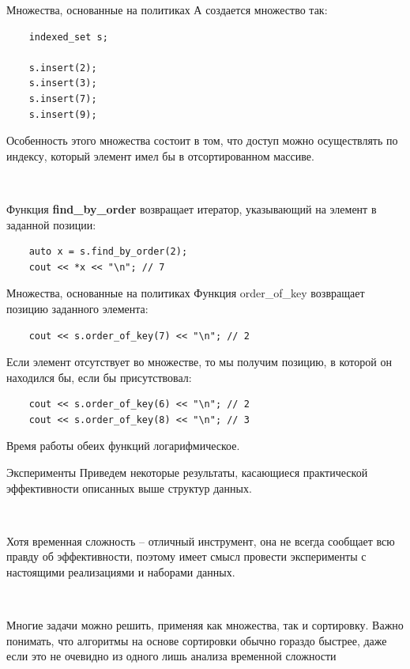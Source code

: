 \documentclass{beamer}
\begin{document}
\begin{frame}[fragile]{Множества, основанные на политиках}
    А создается множество так:
    
    \begin{verbatim}
    indexed_set s;
    
    s.insert(2);
    s.insert(3);
    s.insert(7);
    s.insert(9);
    \end{verbatim}
    
    
    Особенность этого множества состоит в том, что доступ можно осуществлять по индексу, который элемент имел бы в отсортированном массиве.
    
    ~
    
    Функция \textbf{find\_by\_order} возвращает итератор, указывающий на элемент в заданной позиции:
    
    \begin{verbatim}
    auto x = s.find_by_order(2);
    cout << *x << "\n"; // 7
    \end{verbatim}
    
\end{frame}

\begin{frame}[fragile]{Множества, основанные на политиках}    
    Функция order\_of\_key возвращает позицию заданного элемента:
    \begin{verbatim}
    cout << s.order_of_key(7) << "\n"; // 2
    \end{verbatim}
    
    Если элемент отсутствует во множестве, то мы получим позицию, в которой он находился бы, если бы присутствовал:
    \begin{verbatim}
    cout << s.order_of_key(6) << "\n"; // 2
    cout << s.order_of_key(8) << "\n"; // 3
    \end{verbatim}
    Время работы обеих функций логарифмическое.
\end{frame}


\begin{frame}[fragile]{Эксперименты}
    Приведем некоторые результаты, касающиеся практической эффективности описанных выше структур данных. 
    
    ~
    
    Хотя временная сложность -- отличный инструмент, она не всегда сообщает всю правду об эффективности, поэтому имеет смысл провести эксперименты с настоящими реализациями и наборами данных.

    ~
    
    Многие задачи можно решить, применяя как множества, так и сортировку. Важно понимать, что алгоритмы на основе сортировки обычно гораздо быстрее, даже если это не очевидно из одного лишь анализа временной сложности
\end{frame}
\end{document}
